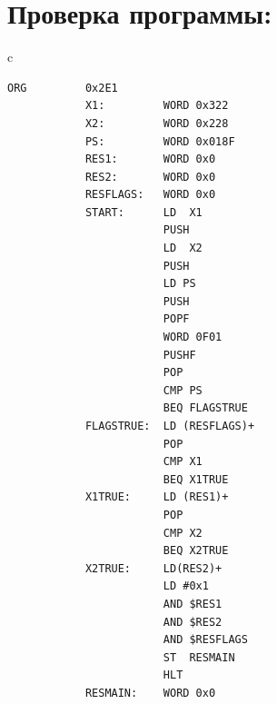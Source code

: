 \section{Проверка программы:}
\begin{center}
    \begin{tabular}{c}
        \begin{lstlisting}[basicstyle=\ttfamily\tiny]
            ORG         0x2E1
            X1:         WORD 0x322
            X2:         WORD 0x228
            PS:         WORD 0x018F
            RES1:       WORD 0x0
            RES2:       WORD 0x0
            RESFLAGS:   WORD 0x0
            START:      LD  X1
                        PUSH
                        LD  X2
                        PUSH
                        LD PS
                        PUSH
                        POPF
                        WORD 0F01
                        PUSHF
                        POP
                        CMP PS
                        BEQ FLAGSTRUE
            FLAGSTRUE:  LD (RESFLAGS)+
                        POP
                        CMP X1
                        BEQ X1TRUE
            X1TRUE:     LD (RES1)+
                        POP
                        CMP X2
                        BEQ X2TRUE
            X2TRUE:     LD(RES2)+
                        LD #0x1
                        AND $RES1
                        AND $RES2
                        AND $RESFLAGS
                        ST  RESMAIN
                        HLT
            RESMAIN:    WORD 0x0
        \end{lstlisting}
    \end{tabular}
\end{center}

